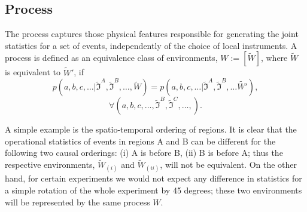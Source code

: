 \documentclass[a4paper,onecolumn,11pt,accepted=2018-05-04]{quantumarticle}
\begin{document}
\subsection{Process}
The process captures those physical features responsible for generating the joint statistics for a set of events, independently of the choice of local instruments. A process is defined as an equivalence class of environments, $W:= [\tilde{W}]$, where
$\tilde{W}$ is equivalent to $\tilde{W}' $, if
\begin{equation}
p(a,b,c,\dots | \tilde{\mathcal{\mathfrak{I}}}^A, \tilde{\mathcal{\mathfrak{I}}}^B,\dots,\tilde{W}) = p(a,b,c,\dots | \tilde{\mathcal{\mathfrak{I}}}^A, \tilde{\mathcal{\mathfrak{I}}}^B,\dots\tilde{W'}),
\end{equation}
\begin{equation*}
\forall (a, b,c,\dots,\tilde{\mathcal{\mathfrak{I}}}^B, \tilde{\mathcal{\mathfrak{I}}}^C,\dots, ).
\end{equation*}

A simple example is the spatio-temporal ordering of regions. It is clear that the operational statistics of events in regions A and B can be different for the following two causal orderings: (i) A is before B, (ii) B is before A; thus the respective environments, $\tilde{W}_{(i)}$ and $\tilde{W}_{(ii)}$, will not be equivalent. On the other hand, for certain experiments we would not expect any difference in statistics for a simple rotation of the whole experiment by 45 degrees; these two environments will be represented by the same process $W$.
\end{document}
